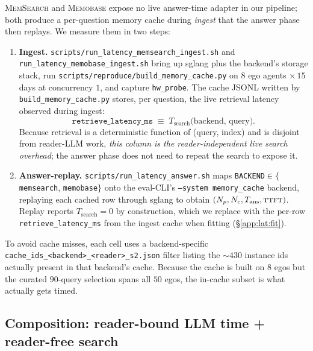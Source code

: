 \textsc{MemSearch} and \textsc{Memobase} expose no live answer-time
adapter in our pipeline; both produce a per-question memory cache during
\emph{ingest} that the answer phase then replays. We measure them in
two steps:

\begin{enumerate}
\item \textbf{Ingest.} \texttt{scripts/run\_latency\_memsearch\_ingest.sh}
and \texttt{run\_latency\_memobase\_ingest.sh} bring up sglang plus the
backend's storage stack, run \texttt{scripts/reproduce/build\_memory\_cache.py}
on $8$ ego agents $\times\,15$ days at concurrency $1$, and capture
\texttt{hw\_probe}. The cache JSONL written by
\texttt{build\_memory\_cache.py} stores, per question, the live retrieval
latency observed during ingest:
\begin{equation*}
\texttt{retrieve\_latency\_ms} \;\equiv\; T_{\text{search}}\!\big(\text{backend, query}\big).
\end{equation*}
Because retrieval is a deterministic function of (query, index) and is
disjoint from reader-LLM work, \emph{this column is the
reader-independent live search overhead}; the answer phase does not need
to repeat the search to expose it.

\item \textbf{Answer-replay.} \texttt{scripts/run\_latency\_answer.sh}
maps \texttt{BACKEND}$\in\{$\texttt{memsearch}, \texttt{memobase}$\}$
onto the eval-CLI's \texttt{--system memory\_cache} backend, replaying
each cached row through sglang to obtain $(N_p, N_c, T_{\text{ans}},
\textsc{ttft})$. Replay reports $T_{\text{search}}=0$ by construction,
which we replace with the per-row \texttt{retrieve\_latency\_ms} from
the ingest cache when fitting (\S\ref{app:lat:fit}).
\end{enumerate}

To avoid cache misses, each cell uses a backend-specific
\texttt{cache\_ids\_<backend>\_<reader>\_s2.json} filter listing the
$\sim\!430$ instance ids actually present in that backend's cache.
Because the cache is built on $8$ egos but the curated $90$-query
selection spans all $50$ egos, the in-cache subset is what actually
gets timed.

\subsection{Composition: reader-bound LLM time + reader-free search}
\label{app:lat:composition}

